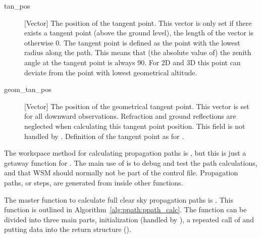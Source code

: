 \begin{description}
   \item[tan\_pos] [Vector] The position of the tangent point. This
     vector is only set if there exists a tangent point (above the
     ground level), the length of the vector is otherwise 0. The
     tangent point is defined as the point with the lowest radius
     along the path. This means that (the absolute value of) the
     zenith angle at the tangent point is always 90\degree. For 2D
     and 3D this point can deviate from the point with lowest
     geometrical altitude.
     
   \item[geom\_tan\_pos] [Vector] The position of the geometrical
     tangent point. This vector is set for all downward observations.
     Refraction and ground reflections are neglected when calculating
     this tangent point position. This field is not handled by
     . Definition of the tangent point
     as for .
\end{description}



\label{sec:ppath:structure}

The workspace method for calculating propagation paths is
, but this is just a getaway function for
. The main use of  is to
debug and test the path calculations, and that WSM should normally not
be part of the control file. Propagation paths, or steps, are
generated from inside other functions.



The master function to calculate full clear sky propagation paths is
. This function is outlined in
Algorithm~\ref{alg:ppath:ppath_calc}. The function can be divided into
three main parts, initialization (handled by
), a repeated call of
 and putting data into the return
structure ().

